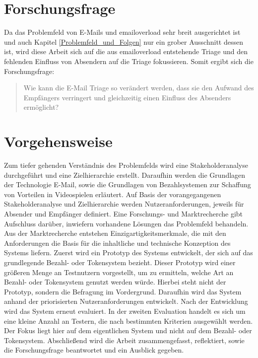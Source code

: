 \section{Forschungsfrage}
\label{Forschungsfrage}

Da das Problemfeld von E-Mails und \gls{emailoverload} sehr breit ausgerichtet ist und auch Kapitel \ref{Problemfeld_und_Folgen} nur ein grober Ausschnitt dessen ist, wird diese Arbeit sich auf die aus \gls{emailoverload} entstehende Triage und den fehlenden Einfluss von Absendern auf die Triage fokussieren. Somit ergibt sich die Forschungsfrage: 

\begin{quotation}
	\noindent Wie kann die E-Mail Triage so verändert werden, dass sie den Aufwand des Empfängers verringert und gleichzeitig einen Einfluss des Absenders ermöglicht?
\end{quotation}


\section{Vorgehensweise}
\label{Vorgehensweise}

Zum tiefer gehenden Verständnis des Problemfelds wird eine Stakeholderanalyse durchgeführt und eine Zielhierarchie erstellt. Daraufhin werden die Grundlagen der Technologie E-Mail, sowie die Grundlagen von Bezahlsystemen zur Schaffung von Vorteilen in Videospielen erläutert. Auf Basis der vorangegangenen Stakeholderanalyse und Zielhierarchie werden Nutzeranforderungen, jeweils für Absender und Empfänger definiert. Eine Forschungs- und Marktrecherche gibt Aufschluss darüber, inwiefern vorhandene Lösungen das Problemfeld behandeln. Aus der Marktrecherche entstehen Einzigartigkeitsmerkmale, die mit den Anforderungen die Basis für die inhaltliche und technische Konzeption des Systems liefern. Zuerst wird ein Prototyp des Systems entwickelt, der sich auf das grundlegende Bezahl- oder Tokensystem bezieht. Dieser Prototyp wird einer größeren Menge an Testnutzern vorgestellt, um zu ermitteln, welche Art an Bezahl- oder Tokensystem genutzt werden würde. Hierbei steht nicht der Prototyp, sondern die Befragung im Vordergrund. Daraufhin wird das System anhand der priorisierten Nutzeranforderungen entwickelt. Nach der Entwicklung wird das System erneut evaluiert. In der zweiten Evaluation handelt es sich um eine kleine Anzahl an Testern, die nach bestimmten Kriterien ausgewählt werden. Der Fokus liegt hier auf dem eigentlichen System und nicht auf dem Bezahl- oder Tokensystem. Abschließend wird die Arbeit zusammengefasst, reflektiert, sowie die Forschungsfrage beantwortet und ein Ausblick gegeben.


